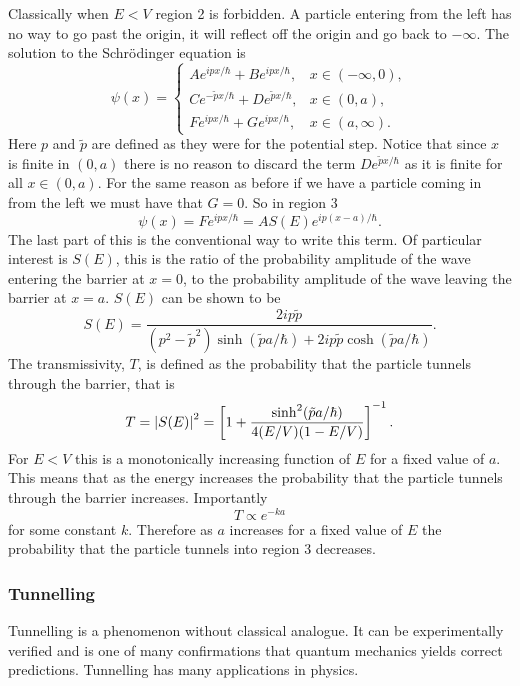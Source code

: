     Classically when \(E < V\) region 2 is forbidden.
    A particle entering from the left has no way to go past the origin, it will reflect off the origin and go back to \(-\infty\).
    The solution to the Schr\"odinger equation is
    \[
        \psi(x) =
        \begin{cases}
            Ae^{ipx/\hbar} + Be^{ipx/\hbar}, & x \in (-\infty, 0),\\
            Ce^{-\tilde{p}x/\hbar} + De^{\tilde{p}x/\hbar}, &x \in (0, a),\\
            Fe^{ipx/\hbar} + Ge^{ipx/\hbar}, & x \in (a, \infty).
        \end{cases}
    \]
    Here \(p\) and \(\tilde{p}\) are defined as they were for the potential step.
    Notice that since \(x\) is finite in \((0, a)\) there is no reason to discard the term \(De^{\tilde{p}x/\hbar}\) as it is finite for all \(x\in(0, a)\).
    For the same reason as before if we have a particle coming in from the left we must have that \(G = 0\).
    So in region 3
    \[\psi(x) = Fe^{ipx/\hbar} = AS(E)e^{ip(x - a)/\hbar}.\]
    The last part of this is the conventional way to write this term.
    Of particular interest is \(S(E)\), this is the ratio of the probability amplitude of the wave entering the barrier at \(x = 0\), to the probability amplitude of the wave leaving the barrier at \(x = a\).
    \(S(E)\) can be shown to be
    \[S(E) = \frac{2ip\tilde{p}}{(p^2 - \tilde{p}^2)\sinh(\tilde{p}a/\hbar) + 2ip\tilde{p}\cosh(\tilde{p}a/\hbar)}.\]
    The transmissivity, \(T\), is defined as the probability that the particle tunnels through the barrier, that is
    \[T = \abs{S(E)}^2 = \left[1 + \frac{\sinh^2(\tilde{p}a/\hbar)}{4(E/V)(1 - E/V)}\right]^{-1}.\]
    For \(E < V\) this is a monotonically increasing function of \(E\) for a fixed value of \(a\).
    This means that as the energy increases the probability that the particle tunnels through the barrier increases.
    Importantly
    \[T \propto e^{-ka}\]
    for some constant \(k\).
    Therefore as \(a\) increases for a fixed value of \(E\) the probability that the particle tunnels into region 3 decreases.
    
    \subsubsection{Tunnelling}
    Tunnelling is a phenomenon without classical analogue.
    It can be experimentally verified and is one of many confirmations that quantum mechanics yields correct predictions.
    Tunnelling has many applications in physics.
    
